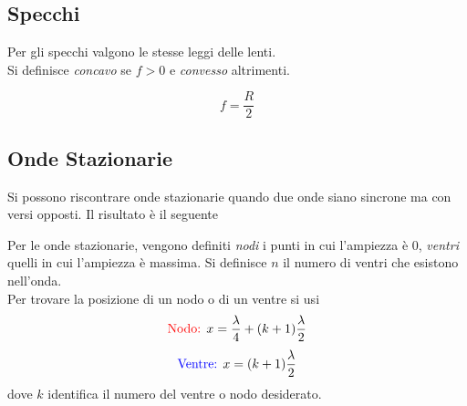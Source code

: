 \subsection{Specchi}
Per gli specchi valgono le stesse leggi delle lenti.\\
Si definisce \emph{concavo} se $f>0$ e \emph{convesso} altrimenti. 
\begin{center}
\end{center}
\begin{equation*}
  f = \frac{R}{2}
\end{equation*}


\subsection{Onde Stazionarie}
Si possono riscontrare onde stazionarie quando due onde siano sincrone ma con versi opposti. Il 
risultato è il seguente

\begin{center}
\end{center}

Per le onde stazionarie, vengono definiti \emph{nodi} i punti in cui l'ampiezza è  $0$,
\emph{ventri} quelli in cui l'ampiezza è massima. Si definisce $n$ il numero di ventri che 
esistono nell'onda.\\
Per trovare la posizione di un nodo o di un ventre si usi
\begin{equation*}
  \mathcolor{red}{\text{Nodo: }} x = \frac{\lambda}{4}+(k+1)\frac{\lambda}{2}
\end{equation*}
\begin{equation*}
  \mathcolor{blue}{\text{Ventre: }} x = (k+1)\frac{\lambda}{2}
\end{equation*}
dove $k$ identifica il numero del ventre o nodo desiderato.

